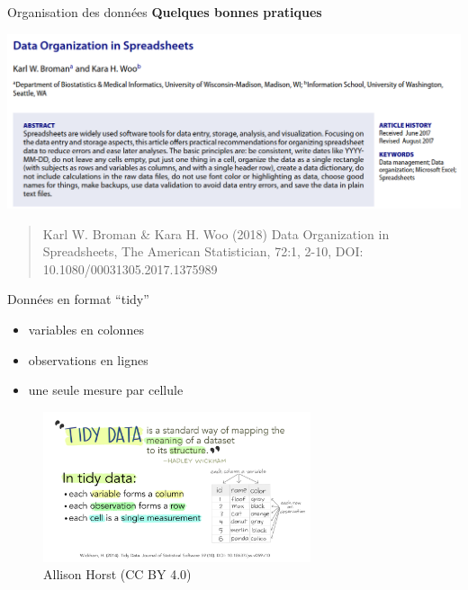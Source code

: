 \documentclass[
  ignorenonframetext,
]{beamer}
\providecommand{\tightlist}{%
  \setlength{\itemsep}{0pt}\setlength{\parskip}{0pt}}\usepackage{longtable,booktabs,array}
\begin{document}
\begin{frame}{Organisation des données}
\protect\hypertarget{organisation-des-donnuxe9es}{}
\textbf{Quelques bonnes pratiques}

\includegraphics{figures/DataOrganizationinSpreadsheets.png}

\begin{quote}
Karl W. Broman \& Kara H. Woo (2018) Data Organization in Spreadsheets,
The American Statistician, 72:1, 2-10, DOI:
10.1080/00031305.2017.1375989
\end{quote}
\end{frame}

\begin{frame}{Données en format ``tidy''}
\protect\hypertarget{donnuxe9es-en-format-tidy}{}
\begin{itemize}
\tightlist
\item
  variables en colonnes
\item
  observations en lignes
\item
  une seule mesure par cellule
\end{itemize}

\begin{figure}

{\centering \includegraphics[width=0.7\textwidth,height=\textheight]{figures/tidydata_1.jpg}

}

\caption{Allison Horst (CC BY 4.0)}

\end{figure}
\end{frame}
\end{document}
